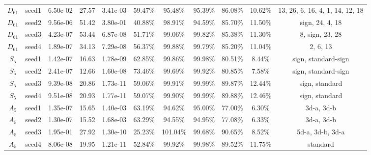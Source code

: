 \begin{tabular}{ccccccccccc}
 $D_{61}$ & seed1 &  6.50e-02 &     27.57 &  3.41e-03 &   59.47\% &   95.48\% &   95.39\% & 86.08\% &            10.62\% & 13, 26, 6, 16, 4, 1, 14, 12, 18 \\
 $D_{61}$ & seed2 &  9.56e-06 &     51.42 &  3.80e-01 &   40.88\% &   98.91\% &   94.59\% & 85.70\% &            11.50\% &                 sign, 24, 4, 18 \\
 $D_{61}$ & seed3 &  4.23e-07 &     53.44 &  6.87e-08 &   51.71\% &   99.06\% &   99.82\% & 85.38\% &            11.30\% &                 8, sign, 23, 28 \\
 $D_{61}$ & seed4 &  1.89e-07 &     34.13 &  7.29e-08 &   56.37\% &   99.88\% &   99.79\% & 85.20\% &            11.04\% &                        2, 6, 13 \\
  $S_{5}$ & seed1 &  1.42e-07 &     16.63 &  1.78e-09 &   62.85\% &   99.86\% &   99.98\% & 80.51\% &             8.44\% &             sign, standard-sign \\
  $S_{5}$ & seed2 &  2.41e-07 &     12.66 &  1.60e-08 &   73.46\% &   99.69\% &   99.92\% & 80.85\% &             7.58\% &             sign, standard-sign \\
  $S_{5}$ & seed3 &  9.39e-08 &     20.86 &  1.73e-11 &   59.06\% &   99.91\% &   99.99\% & 89.87\% &            12.44\% &                  sign, standard \\
  $S_{5}$ & seed4 &  9.51e-08 &     20.93 &  1.77e-11 &   59.07\% &   99.90\% &   99.99\% & 89.88\% &            12.46\% &                  sign, standard \\
  $A_{5}$ & seed1 &  1.35e-07 &     15.65 &  1.40e-03 &   63.19\% &   94.62\% &   95.00\% & 77.00\% &             6.30\% &                      3d-a, 3d-b \\
  $A_{5}$ & seed2 &  1.30e-07 &     15.52 &  1.68e-03 &   63.29\% &   94.55\% &   94.95\% & 77.08\% &             6.33\% &                      3d-a, 3d-b \\
  $A_{5}$ & seed3 &  1.95e-01 &     27.92 &  1.30e-10 &   25.23\% &  101.04\% &   99.68\% & 90.65\% &             8.52\% &                5d-a, 3d-b, 3d-a \\
  $A_{5}$ & seed4 &  8.06e-08 &     19.95 &  1.21e-11 &   52.84\% &   99.92\% &   99.98\% & 89.52\% &            11.75\% &                        standard \\
\bottomrule
\end{tabular}
